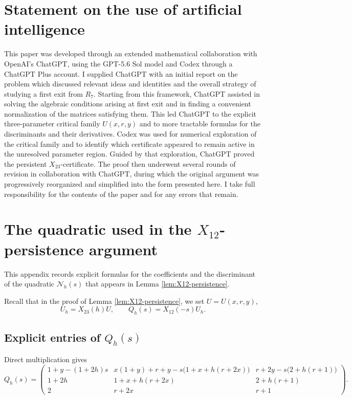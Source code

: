\documentclass[11pt,onecolumn]{amsart}
\theoremstyle{plain}
\theoremstyle{definition}
\theoremstyle{remark}
\begin{document}
\section*{Statement on the use of artificial intelligence}


This paper was developed through an extended mathematical collaboration
with OpenAI's ChatGPT, using the GPT-5.6 Sol model and Codex through a ChatGPT Plus account. I supplied ChatGPT with an initial report on the problem which discussed  relevant ideas and identities and the overall strategy of studying a first exit from
$R_7$. Starting from this framework, ChatGPT assisted in solving the  algebraic conditions arising at first exit and in finding a convenient normalization of the matrices satisfying them. This led ChatGPT to the explicit three-parameter critical family \(U(x,r,y)\) and to more tractable formulas for the discriminants and their derivatives. Codex was used for numerical exploration of the critical family and to identify
which certificate appeared to remain active in the unresolved
parameter region. Guided by that exploration, ChatGPT proved the persistent \(X_{23}\)-certificate. The proof then underwent several rounds of revision in collaboration with ChatGPT, during which the original argument was progressively reorganized and simplified into the form presented here.
I take full responsibility for the contents of the paper and for any errors 
that remain.

\appendix
\section{The quadratic used in the
	\texorpdfstring{$X_{12}$}{X12}-persistence argument}
\label{app:X12-persistence-formulas}
This appendix records explicit formulas for the coefficients and the discriminant of the quadratic $\mathcal N_h(s)$
that appears in Lemma \ref{lem:X12-persistence}.
 
Recall that in the proof of Lemma \ref{lem:X12-persistence}, we set
$U=U(x,r,y)$,
\[
U_h=X_{23}(h)U,
\qquad
Q_h(s)=X_{12}(-s)U_h.
\]

\subsection*{Explicit entries of $Q_h(s)$}
Direct multiplication gives
\small{\[
Q_h(s)=
\begin{pmatrix}
	1+y-(1+2h)s
	&
	x(1+y)+r+y-s\bigl(1+x+h(r+2x)\bigr)
	&
	r+2y-s\bigl(2+h(r+1)\bigr)
	\\[2mm]
	1+2h
	&
	1+x+h(r+2x)
	&
	2+h(r+1)
	\\
	2&r+2x&r+1
\end{pmatrix}.
\]}
\end{document}
